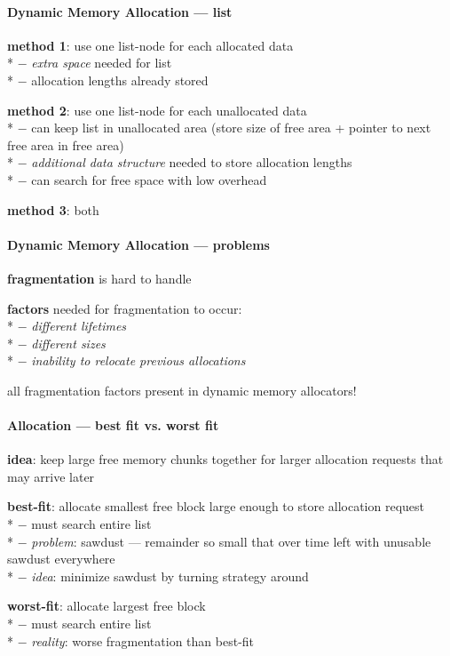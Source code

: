 \paragraph{Dynamic Memory Allocation --- list}
\begin{items}
  \item \textbf{method 1}: use one list-node for each allocated data \\*
    $ - $ \emph{extra space} needed for list \\*
    $ - $ allocation lengths already stored
  \item \textbf{method 2}: use one list-node for each unallocated data \\*
    $ - $ can keep list in unallocated area (store size of free area + pointer to next free area in free area) \\*
    $ - $ \emph{additional data structure} needed to store allocation lengths \\*
    $ - $ can search for free space with low overhead
  \item \textbf{method 3}: both
\end{items}

\paragraph{Dynamic Memory Allocation --- problems}
\begin{items}
  \item \textbf{fragmentation} is hard to handle
  \item \textbf{factors} needed for fragmentation to occur: \\*
    $ - $ \emph{different lifetimes} \\*
    $ - $ \emph{different sizes} \\*
    $ - $ \emph{inability to relocate previous allocations}
  \item all fragmentation factors present in dynamic memory allocators!
\end{items}

\paragraph{Allocation --- best fit vs. worst fit}
\begin{items}
  \item \textbf{idea}: keep large free memory chunks together for larger allocation requests that may arrive later
  \item \textbf{best-fit}: allocate smallest free block large enough to store allocation request \\*
    $ - $ must search entire list \\*
    $ - $ \emph{problem}: sawdust --- remainder so small that over time left with unusable sawdust everywhere \\*
    $ - $ \emph{idea}: minimize sawdust by turning strategy around
  \item \textbf{worst-fit}: allocate largest free block \\*
    $ - $ must search entire list \\*
    $ - $ \emph{reality}: worse fragmentation than best-fit
\end{items}

